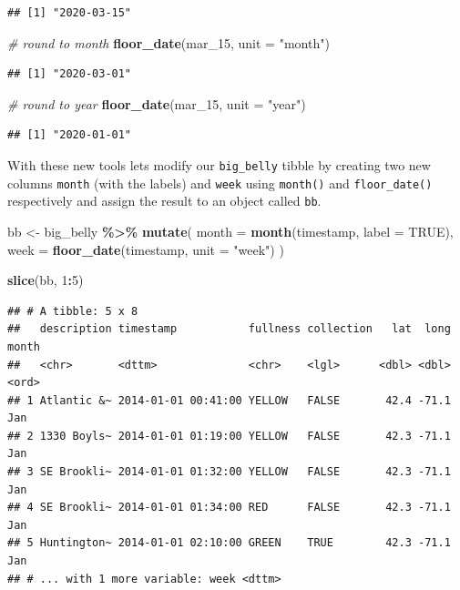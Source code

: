 \documentclass[
]{book}
\newenvironment{Shaded}{\begin{snugshade}}{\end{snugshade}}
\newcommand{\CommentTok}[1]{\textcolor[rgb]{0.56,0.35,0.01}{\textit{#1}}}
\newcommand{\DataTypeTok}[1]{\textcolor[rgb]{0.13,0.29,0.53}{#1}}
\newcommand{\DecValTok}[1]{\textcolor[rgb]{0.00,0.00,0.81}{#1}}
\newcommand{\KeywordTok}[1]{\textcolor[rgb]{0.13,0.29,0.53}{\textbf{#1}}}
\newcommand{\NormalTok}[1]{#1}
\newcommand{\OperatorTok}[1]{\textcolor[rgb]{0.81,0.36,0.00}{\textbf{#1}}}
\newcommand{\OtherTok}[1]{\textcolor[rgb]{0.56,0.35,0.01}{#1}}
\newcommand{\StringTok}[1]{\textcolor[rgb]{0.31,0.60,0.02}{#1}}
\begin{document}
\begin{verbatim}
## [1] "2020-03-15"
\end{verbatim}

\begin{Shaded}
\begin{Highlighting}[]
\CommentTok{\# round to month}
\KeywordTok{floor\_date}\NormalTok{(mar\_}\DecValTok{15}\NormalTok{, }\DataTypeTok{unit =} \StringTok{"month"}\NormalTok{)}
\end{Highlighting}
\end{Shaded}

\begin{verbatim}
## [1] "2020-03-01"
\end{verbatim}

\begin{Shaded}
\begin{Highlighting}[]
\CommentTok{\# round to year}
\KeywordTok{floor\_date}\NormalTok{(mar\_}\DecValTok{15}\NormalTok{, }\DataTypeTok{unit =} \StringTok{"year"}\NormalTok{)}
\end{Highlighting}
\end{Shaded}

\begin{verbatim}
## [1] "2020-01-01"
\end{verbatim}

With these new tools lets modify our \texttt{big\_belly} tibble by creating two new columns \texttt{month} (with the labels) and \texttt{week} using \texttt{month()} and \texttt{floor\_date()} respectively and assign the result to an object called \texttt{bb}.

\begin{Shaded}
\begin{Highlighting}[]
\NormalTok{bb \textless{}{-}}\StringTok{ }\NormalTok{big\_belly }\OperatorTok{\%\textgreater{}\%}\StringTok{ }
\StringTok{  }\KeywordTok{mutate}\NormalTok{(}
    \DataTypeTok{month =} \KeywordTok{month}\NormalTok{(timestamp, }\DataTypeTok{label =} \OtherTok{TRUE}\NormalTok{),}
    \DataTypeTok{week =} \KeywordTok{floor\_date}\NormalTok{(timestamp, }\DataTypeTok{unit =} \StringTok{"week"}\NormalTok{)}
\NormalTok{  )}

\KeywordTok{slice}\NormalTok{(bb, }\DecValTok{1}\OperatorTok{:}\DecValTok{5}\NormalTok{)}
\end{Highlighting}
\end{Shaded}

\begin{verbatim}
## # A tibble: 5 x 8
##   description timestamp           fullness collection   lat  long month
##   <chr>       <dttm>              <chr>    <lgl>      <dbl> <dbl> <ord>
## 1 Atlantic &~ 2014-01-01 00:41:00 YELLOW   FALSE       42.4 -71.1 Jan  
## 2 1330 Boyls~ 2014-01-01 01:19:00 YELLOW   FALSE       42.3 -71.1 Jan  
## 3 SE Brookli~ 2014-01-01 01:32:00 YELLOW   FALSE       42.3 -71.1 Jan  
## 4 SE Brookli~ 2014-01-01 01:34:00 RED      FALSE       42.3 -71.1 Jan  
## 5 Huntington~ 2014-01-01 02:10:00 GREEN    TRUE        42.3 -71.1 Jan  
## # ... with 1 more variable: week <dttm>
\end{verbatim}
\end{document}

